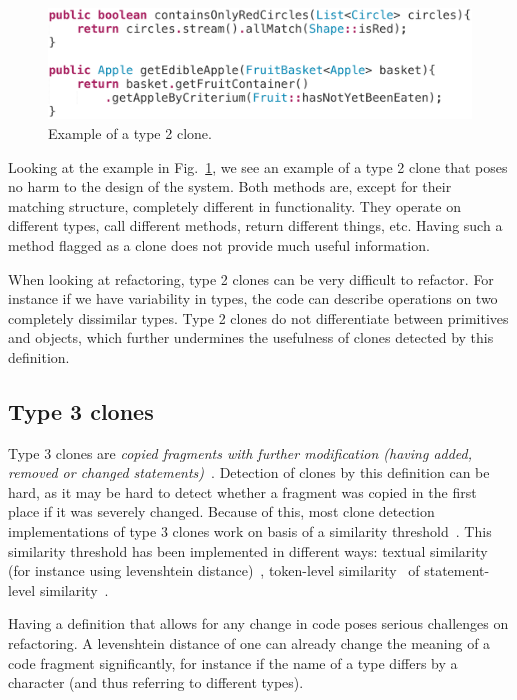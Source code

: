 \documentclass[a4paper]{article}
\begin{document}
\begin{figure}[H]
  \includegraphics[width=1\columnwidth]{img/type2}
  \caption{Example of a type 2 clone.}
  \label{fig:type2}
\end{figure}

Looking at the example in Fig.~\ref{fig:type2}, we see an example of a type 2 clone that poses no harm to the design of the system. Both methods are, except for their matching structure, completely different in functionality. They operate on different types, call different methods, return different things, etc. Having such a method flagged as a clone does not provide much useful information.

When looking at refactoring, type 2 clones can be very difficult to refactor. For instance if we have variability in types, the code can describe operations on two completely dissimilar types. Type 2 clones do not differentiate between primitives and objects, which further undermines the usefulness of clones detected by this definition.

\subsection{Type 3 clones}\label{sec:type3}
Type 3 clones are \textit{copied fragments with further modification (having added, removed or changed statements)}~\cite{roy2007survey}. Detection of clones by this definition can be hard, as it may be hard to detect whether a fragment was copied in the first place if it was severely changed. Because of this, most clone detection implementations of type 3 clones work on basis of a similarity threshold~\cite{roy2008nicad,ragkhitwetsagul2019siamese,jiang2007deckard,semura2017ccfindersw}. This similarity threshold has been implemented in different ways: textual similarity (for instance using levenshtein distance)~\cite{lavoie2011automated}, token-level similarity~\cite{sajnani2016sourcerercc} of statement-level similarity~\cite{kamalpriya2017enhancing}.

Having a definition that allows for any change in code poses serious challenges on refactoring. A levenshtein distance of one can already change the meaning of a code fragment significantly, for instance if the name of a type differs by a character (and thus referring to different types).
\end{document}
